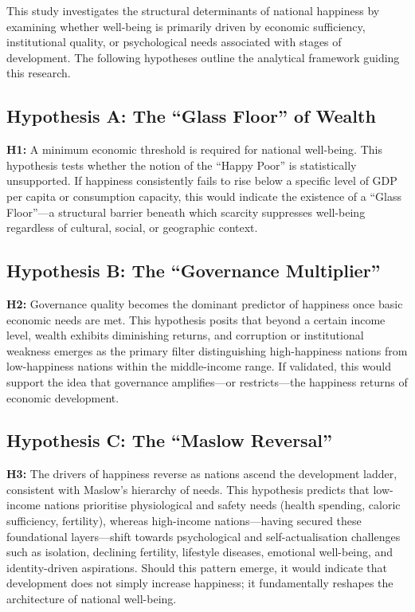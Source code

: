 \documentclass[conference]{IEEEtran}
\begin{document}
This study investigates the structural determinants of national happiness by examining whether well-being is primarily driven by economic sufficiency, institutional quality, or psychological needs associated with stages of development. The following hypotheses outline the analytical framework guiding this research.

\subsection*{Hypothesis A: The ``Glass Floor'' of Wealth}
\textbf{H1:} A minimum economic threshold is required for national well-being. This hypothesis tests whether the notion of the ``Happy Poor'' is statistically unsupported. If happiness consistently fails to rise below a specific level of GDP per capita or consumption capacity, this would indicate the existence of a ``Glass Floor''—a structural barrier beneath which scarcity suppresses well-being regardless of cultural, social, or geographic context.

\subsection*{Hypothesis B: The ``Governance Multiplier''}
\textbf{H2:} Governance quality becomes the dominant predictor of happiness once basic economic needs are met. This hypothesis posits that beyond a certain income level, wealth exhibits diminishing returns, and corruption or institutional weakness emerges as the primary filter distinguishing high-happiness nations from low-happiness nations within the middle-income range. If validated, this would support the idea that governance amplifies—or restricts—the happiness returns of economic development.

\subsection*{Hypothesis C: The ``Maslow Reversal''}
\textbf{H3:} The drivers of happiness reverse as nations ascend the development ladder, consistent with Maslow's hierarchy of needs. This hypothesis predicts that low-income nations prioritise physiological and safety needs (health spending, caloric sufficiency, fertility), whereas high-income nations—having secured these foundational layers—shift towards psychological and self-actualisation challenges such as isolation, declining fertility, lifestyle diseases, emotional well-being, and identity-driven aspirations. Should this pattern emerge, it would indicate that development does not simply increase happiness; it fundamentally reshapes the architecture of national well-being.
\end{document}
